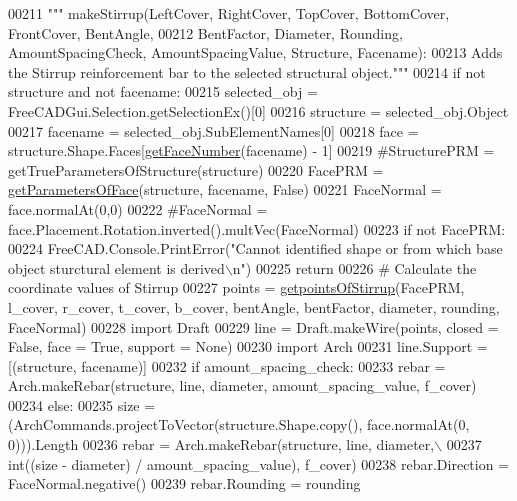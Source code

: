 \begin{DoxyCode}
00211     \textcolor{stringliteral}{""" makeStirrup(LeftCover, RightCover, TopCover, BottomCover, FrontCover, BentAngle,}
00212 \textcolor{stringliteral}{    BentFactor, Diameter, Rounding, AmountSpacingCheck, AmountSpacingValue, Structure, Facename):}
00213 \textcolor{stringliteral}{    Adds the Stirrup reinforcement bar to the selected structural object."""}
00214     \textcolor{keywordflow}{if} \textcolor{keywordflow}{not} structure \textcolor{keywordflow}{and} \textcolor{keywordflow}{not} facename:
00215         selected\_obj = FreeCADGui.Selection.getSelectionEx()[0]
00216         structure = selected\_obj.Object
00217         facename = selected\_obj.SubElementNames[0]
00218     face = structure.Shape.Faces[\hyperlink{namespaceRebarfunc_a3885b3b63e3a41508ac79bc7550cf301}{getFaceNumber}(facename) - 1]
00219     \textcolor{comment}{#StructurePRM = getTrueParametersOfStructure(structure)}
00220     FacePRM = \hyperlink{namespaceRebarfunc_a92122b3d7cedd3d47bb63380a5ac4d08}{getParametersOfFace}(structure, facename, \textcolor{keyword}{False})
00221     FaceNormal = face.normalAt(0,0)
00222     \textcolor{comment}{#FaceNormal = face.Placement.Rotation.inverted().multVec(FaceNormal)}
00223     \textcolor{keywordflow}{if} \textcolor{keywordflow}{not} FacePRM:
00224         FreeCAD.Console.PrintError(\textcolor{stringliteral}{"Cannot identified shape or from which base object sturctural element is
       derived\(\backslash\)n"})
00225         \textcolor{keywordflow}{return}
00226     \textcolor{comment}{# Calculate the coordinate values of Stirrup}
00227     points = \hyperlink{namespaceStirrup_aa6df5118806bfe9d3a799e1bf549bb0a}{getpointsOfStirrup}(FacePRM, l\_cover, r\_cover, t\_cover, b\_cover, bentAngle, 
      bentFactor, diameter, rounding, FaceNormal)
00228     \textcolor{keyword}{import} Draft
00229     line = Draft.makeWire(points, closed = \textcolor{keyword}{False}, face = \textcolor{keyword}{True}, support = \textcolor{keywordtype}{None})
00230     \textcolor{keyword}{import} Arch
00231     line.Support = [(structure, facename)]
00232     \textcolor{keywordflow}{if} amount\_spacing\_check:
00233         rebar = Arch.makeRebar(structure, line, diameter, amount\_spacing\_value, f\_cover)
00234     \textcolor{keywordflow}{else}:
00235         size = (ArchCommands.projectToVector(structure.Shape.copy(), face.normalAt(0, 0))).Length
00236         rebar = Arch.makeRebar(structure, line, diameter,\(\backslash\)
00237             int((size - diameter) / amount\_spacing\_value), f\_cover)
00238     rebar.Direction = FaceNormal.negative()
00239     rebar.Rounding = rounding

\end{DoxyCode}
